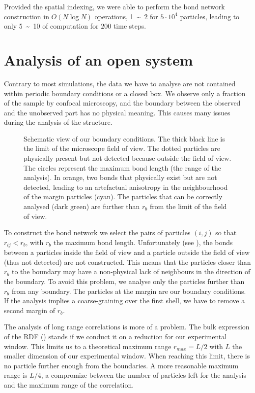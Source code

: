 Provided the spatial indexing, we were able to perform the bond network construction in $O(N\log N)$ operations,  \unit{1\sim 2}{\second} for $5 \cdot 10^4$ particles, leading to only \unit{5\sim 10}{\minute} of computation for $200$ time steps.

\section{Analysis of an open system}

Contrary to most simulations, the data we have to analyse are not contained within periodic boundary conditions or a closed box. We observe only a fraction of the sample by confocal microscopy, and the boundary between the observed and the unobserved part has no physical meaning. This causes many issues during the analysis of the structure.

\begin{figure}
	\centering
	\def\svgwidth{0.8\textwidth}
	\caption{Schematic view of our boundary conditions. The thick black line is the limit of the microscope field of view. The dotted particles are physically present but not detected because outside the field of view. The circles represent the maximum bond length (the range of the analysis). In orange, two bonds that physically exist but are not detected, leading to an artefactual anisotropy in the neighbourhood of the margin particles (cyan). The particles that can be correctly analysed (dark green) are further than $r_b$ from the limit of the field of view.}
	\label{fig:margin}
\end{figure}

To construct the bond network we select the pairs of particles $(i, j)$ so that $r_{ij}<r_b$, with $r_b$ the maximum bond length. Unfortunately (see ), the bonds between a particles inside the field of view and a particle outside the field of view (thus not detected) are not constructed. This means that the particles closer than $r_b$ to the boundary may have a non-physical lack of neighbours in the direction of the boundary. To avoid this problem, we analyse only the particles further than $r_b$ from any boundary. The particles at the margin are our boundary conditions. If the analysis implies a coarse-graining over the first shell, we have to remove a second margin of $r_b$.

The analysis of long range correlations is more of a problem. The bulk expression of the \ac{RDF} () stands if we conduct it on a reduction for our experimental window. This limits us to a theoretical maximum range $r_{max}=L/2$ with $L$ the smaller dimension of our experimental window. When reaching this limit, there is no particle further enough from the boundaries. A more reasonable maximum range is $L/4$, a compromize between the number of particles left for the analysis and the maximum range of the correlation. 

